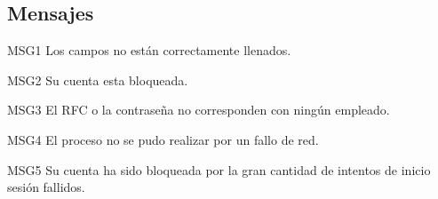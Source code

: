 \subsection{Mensajes}

\begin{Citemize}
	\item MSG1 Los campos no están correctamente llenados. 
	\item MSG2 Su cuenta esta bloqueada. 
	\item MSG3 El RFC o la contraseña no corresponden con ningún empleado. 
	\item MSG4 El proceso no se pudo realizar por un fallo de red. 
	\item MSG5 Su cuenta ha sido bloqueada por la gran cantidad de intentos de inicio sesión fallidos.
\end{Citemize}

